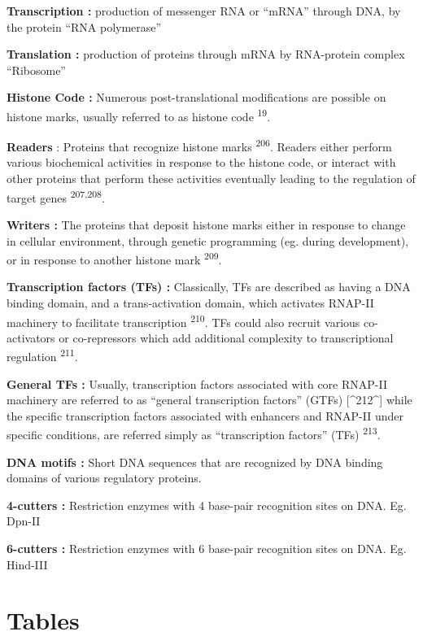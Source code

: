 \documentclass[11pt,twoside]{MPIthesis}
\theoremstyle{definition}
\theoremstyle{definition}
\theoremstyle{definition}
\theoremstyle{remark}
\begin{document}
\textbf{Transcription :} production of messenger RNA or ``mRNA'' through
DNA, by the protein ``RNA polymerase''

\textbf{Translation :} production of proteins through mRNA by
RNA-protein complex ``Ribosome''

\textbf{Histone Code :} Numerous post-translational modifications are
possible on histone marks, usually referred to as histone code
\textsuperscript{19}.

\textbf{Readers} : Proteins that recognize histone marks
\textsuperscript{206}. Readers either perform various biochemical
activities in response to the histone code, or interact with other
proteins that perform these activities eventually leading to the
regulation of target genes \textsuperscript{207,208}.

\textbf{Writers :} The proteins that deposit histone marks either in
response to change in cellular environment, through genetic programming
(eg. during development), or in response to another histone mark
\textsuperscript{209}.

\textbf{Transcription factors (TFs) :} Classically, TFs are described as
having a DNA binding domain, and a trans-activation domain, which
activates RNAP-II machinery to facilitate transcription
\textsuperscript{210}. TFs could also recruit various co-activators or
co-repressors which add additional complexity to transcriptional
regulation \textsuperscript{211}.

\textbf{General TFs :} Usually, transcription factors associated with
core RNAP-II machinery are referred to as ``general transcription
factors'' (GTFs) {[}\^{}212\^{}{]} while the specific transcription
factors associated with enhancers and RNAP-II under specific conditions,
are referred simply as ``transcription factors'' (TFs)
\textsuperscript{213}.

\textbf{DNA motifs :} Short DNA sequences that are recognized by DNA
binding domains of various regulatory proteins.

\textbf{4-cutters :} Restriction enzymes with 4 base-pair recognition
sites on DNA. Eg. Dpn-II

\textbf{6-cutters :} Restriction enzymes with 6 base-pair recognition
sites on DNA. Eg. Hind-III

\section{Tables}\label{tables}


\end{document}
